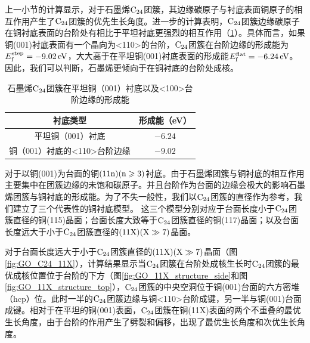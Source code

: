 上一小节的计算显示，对于石墨烯$\rm{C_{24}}$团簇，其边缘碳原子与衬底表面铜原子的相互作用产生了$\rm{C_{24}}$团簇的优先生长角度。进一步的计算表明，$\rm{C_{24}}$团簇边缘碳原子在铜衬底表面的台阶处有相比于平坦衬底更强烈的相互作用（\ref{tab:GO_flat_vs_step}）。具体而言，如果铜(001)衬底表面有一个晶向为<110>的台阶，$\rm{C_{24}}$团簇在台阶边缘的形成能为$E_{\rm f}^{\rm step}=\SI{-9.02}{\electronvolt}$，大大高于在平坦铜(001)衬底表面的形成能$E_{\rm f}^{\rm flat}=\SI{-6.24}{\electronvolt}$。因此，我们可以判断，石墨烯更倾向于在铜衬底的台阶处成核。

\begin{table}
    \centering
    \caption{石墨烯$\rm{C_{24}}$团簇在平坦铜（001）衬底以及<100>台阶边缘的形成能}
    \begin{tabular}{cc}
        \toprule
        衬底类型                     & 形成能（\si{\electronvolt}） \\
        \midrule
        平坦铜（001）衬底            & $-6.24$                      \\
        铜（001）衬底的<110>台阶边缘 & $-9.02$                      \\
        \bottomrule
    \end{tabular}
    \label{tab:GO_flat_vs_step}
\end{table}

对于以铜(001)为台面的铜$\rm{(11n)(n \geqslant 3)}$衬底。由于石墨烯团簇与铜衬底的相互作用主要集中在团簇边缘的未饱和碳原子。并且台阶作为台面的边缘会极大的影响石墨烯团簇与铜衬底的形成能。为了不失一般性，我们以$\rm{C_{24}}$团簇的直径作为参考，我们建立了三个代表性的铜衬底模型。
这三个模型分别对应于台面长度小于$\rm{C_{24}}$团簇直径的铜(115)晶面；台面长度大致等于$\rm{C_{24}}$团簇直径的铜(117)晶面；以及台面长度远大于小于$\rm{C_{24}}$团簇直径的$\rm (11X)(X \gg 7 )$晶面。

对于台面长度远大于小于$\rm{C_{24}}$团簇直径的$\rm (11X)(X \gg 7 )$晶面（图\ref{fig:GO_C24_11X}），计算结果显示当$\rm{C_{24}}$团簇在台阶处成核生长时$\rm{C_{24}}$团簇的最优成核位置位于台阶的下方（图\ref{fig:GO_11X_structure_side}和图\ref{fig:GO_11X_structure_top}），$\rm{C_{24}}$团簇的中央空洞位于铜(001)台面的六方密堆（hcp）位。此时一半的$\rm{C_{24}}$团簇边缘与铜<110>台阶成键，另一半与铜(001)台面成键。相对于在平坦的铜(001)表面，$\rm{C_{24}}$团簇在铜(11X)表面的两个不重叠的最优生长角度，由于台阶的作用产生了劈裂和偏移，出现了最优生长角度和次优生长角度。

